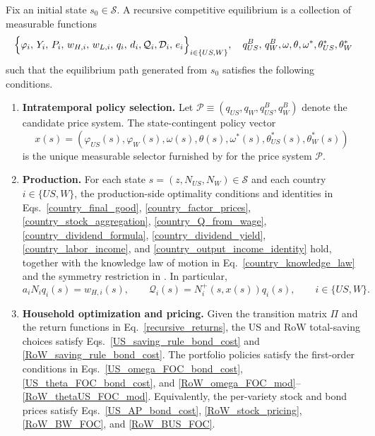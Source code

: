 \documentclass{article}
\begin{document}
\begin{defi}\label{def_recursive_equilibrium}
Fix an initial state $s_0\in\mathcal S$. A recursive competitive equilibrium is a collection of measurable functions
\[
\Bigl\{
\varphi_i,\,Y_i,\,P_i,\,w_{H,i},\,w_{L,i},\,q_i,\,d_i, \mathcal Q_i, \mathcal D_i,\,e_i
\Bigr\}_{i\in\{US,W\}},
\quad
q^B_{US},\,q^B_W, \omega, \theta, \omega^*, \theta_{US}^*, \theta_W^*
\]
such that the equilibrium path generated from $s_0$ satisfies the following conditions.

\begin{enumerate}
    \item \textbf{Intratemporal policy selection.} Let $\mathcal P\equiv(q_{US},q_W,q^B_{US},q^B_W)$ denote the candidate price system. The state-contingent policy vector
    \[
    x(s)=(\varphi_{US}(s),\varphi_W(s),\omega(s),\theta(s),\omega^*(s),\theta_{US}^*(s),\theta_W^*(s))
    \]
    is the unique measurable selector furnished by  for the price system $\mathcal P$.

    \item \textbf{Production.} For each state $s=(z,N_{US},N_W)\in\mathcal S$ and each country $i\in\{US,W\}$, the production-side optimality conditions and identities in Eqs.~\eqref{country_final_good}, \eqref{country_factor_prices}, \eqref{country_stock_aggregation}, \eqref{country_Q_from_wage}, \eqref{country_dividend_formula}, \eqref{country_dividend_yield}, \eqref{country_labor_income}, and \eqref{country_output_income_identity} hold, together with the knowledge law of motion in Eq.~\eqref{country_knowledge_law} and the symmetry restriction in . In particular,
    \[
    a_iN_iq_i(s)=w_{H,i}(s),
    \qquad
    \mathcal Q_i(s)=N_i^+(s,x(s))q_i(s),
    \qquad
    i\in\{US,W\}.
    \]

    \item \textbf{Household optimization and pricing.} Given the transition matrix $\Pi$ and the return functions in Eq.~\eqref{recursive_returns}, the US and RoW total-saving choices satisfy Eqs.~\eqref{US_saving_rule_bond_cost} and \eqref{RoW_saving_rule_bond_cost}. The portfolio policies satisfy the first-order conditions in Eqs.~\eqref{US_omega_FOC_bond_cost}, \eqref{US_theta_FOC_bond_cost}, and \eqref{RoW_omega_FOC_mod}--\eqref{RoW_thetaUS_FOC_mod}. Equivalently, the per-variety stock and bond prices satisfy Eqs.~\eqref{US_AP_bond_cost}, \eqref{RoW_stock_pricing}, \eqref{RoW_BW_FOC}, and \eqref{RoW_BUS_FOC}.


\end{enumerate}
\end{defi}
\end{document}

